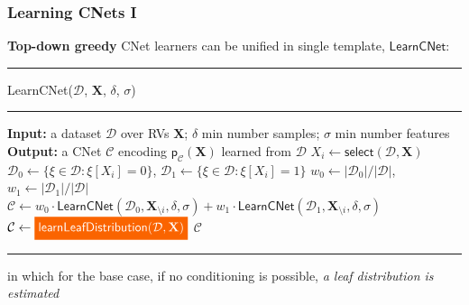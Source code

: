 \documentclass[xcolor={usenames,dvipsnames,svgnames}, compress]{beamer}
\newcommand{\highlight}[2][yellow]{\mathchoice%
  {\colorbox{#1}{\strut\textcolor{white}{$\displaystyle{#2}$}}}%
  {\colorbox{#1}{\strut\textcolor{white}{$\textstyle{#2}$}}}%
  {\colorbox{#1}{\strut\textcolor{white}{$\scriptstyle{#2}$}}}%
  {\colorbox{#1}{\strut\textcolor{white}{$\scriptscriptstyle{#2}$}}}}%
\begin{document}
\begin{frame}[t]
  \frametitle{Learning CNets I}
  \small
      \textbf{Top-down greedy} CNet learners %
    can be unified in single template, $\mathsf{LearnCNet}$:\vspace{-10pt}
 \begin{center}  
  \begin{minipage}{0.9\linewidth}
    \vspace{10pt}
        \scriptsize
        {\hrule\flushleft\textsf{LearnCNet}($\mathcal{D}$, $\mathbf{X}$, 
        $\delta$, $\sigma$)\\\hrule}
  \begin{algorithmic}[1]
    \State \textbf{Input:} a dataset $\mathcal{D}$ over RVs
    $\mathbf{X}$; $\delta$
    min number samples; $\sigma$ min number features
    \State  \textbf{Output:}  a CNet $\mathcal{C}$ encoding  $\mathsf{p}_{\mathcal{C}}(\mathbf{X})$ learned from $\mathcal D$
    \State $X_i\leftarrow  \mathsf{select}(\mathcal D, \mathbf X)$
    \State $\mathcal D_0 \leftarrow \{\xi \in \mathcal D: \xi[X_i]=0 \}$, $\mathcal D_1 \leftarrow \{\xi \in \mathcal D: \xi[X_i]=1 \}$
    \State $w_0 \leftarrow |\mathcal D_0| / |\mathcal D|$, $w_1 \leftarrow |\mathcal   D_1| / |\mathcal D|$
    \State $\mathcal{C} \leftarrow
    w_0\cdot\mathsf{LearnCNet}(\mathcal D_0, \mathbf X_{\setminus i},
     \delta, \sigma) + w_1 \cdot\mathsf{LearnCNet}(\mathcal D_1, \mathbf X_{\setminus i}, \delta, \sigma) $
    \Else 
    \State $\mathcal{C} \leftarrow
    \highlight[gold4]{\mathsf{learnLeafDistribution}(\mathcal D,
      \mathbf X
      )}$
    \EndIf
    \State \Return $\mathcal{C}$
  \end{algorithmic}
  \hrule
\end{minipage}
\end{center}
\vspace{10pt}
  \small
  in which for the base case, if no conditioning is possible, \emph{a leaf
  distribution is estimated}
\end{frame}
\end{document}
